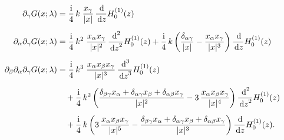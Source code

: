 \begin{align*}
  \partial_\gamma G(x; \lambda) &= \frac{\ii}{4}\, k\;  \frac{x_\gamma}{|x|}\, \frac{\d{}}{\d z} H_0^{(1)}(z) \\[0.5em]
  \partial_\alpha \partial_\gamma G(x; \lambda) 
  &= \frac{\ii}{4} \, k^2 \;  \frac{x_\alpha x_\gamma}{|x|^2} \, \frac{\d{}^2}{\d z^2} H_0^{(1)}(z) + \frac{\ii}{4}\,  k \,\bigg(\frac{\delta_{\alpha\gamma}}{|x|} - \frac{x_\alpha x_\gamma}{|x|^3} \bigg)\, \frac{\d{}}{\d z} H_0^{(1)}(z) \\[0.5em]
  \partial_\beta \partial_\alpha \partial_\gamma G(x; \lambda)
  &= \frac{\ii}{4} \, k^3 \; \frac{x_\alpha x_\beta x_\gamma}{|x|^3} \, \frac{\d{}^3}{\d z^3} H_0^{(1)}(z) \\[0.5em]
  &\quad + \frac{\ii}{4} \, k^2 \,\bigg(\frac{\delta_{\beta\gamma} x_\alpha + \delta_{\alpha \gamma} x_\beta + \delta_{\alpha \beta} x_\gamma}{|x|^2} - 3\, \frac{x_\alpha x_\beta x_\gamma}{|x|^4} \bigg)\, \frac{\d{}^2}{\d z^2} H_0^{(1)}(z) \\[0.5em]
  &\quad + \frac{\ii}{4} \, k \, \bigg( 3\, \frac{x_\alpha x_\beta x_\gamma}{|x|^5} - \frac{\delta_{\beta\gamma} x_\alpha + \delta_{\alpha\gamma} x_\beta + \delta_{\alpha\beta} x_\gamma}{|x|^3} \bigg)\, \frac{\d{}}{\d z} H_0^{(1)}(z).
\end{align*}

